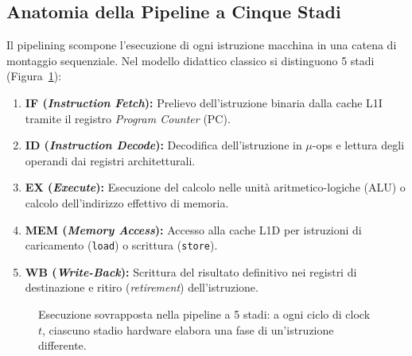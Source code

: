 \FloatBarrier
\subsection{Anatomia della Pipeline a Cinque Stadi}
\label{subsec:pipeline-5-stadi}

Il pipelining scompone l'esecuzione di ogni istruzione macchina in una catena di montaggio sequenziale. Nel modello didattico classico si distinguono 5 stadi (Figura~\ref{fig:pipeline-5-stadi}):
\begin{enumerate}
    \item \textbf{IF (\textit{Instruction Fetch}):} Prelievo dell'istruzione binaria dalla cache L1I tramite il registro \textit{Program Counter} (PC).
    \item \textbf{ID (\textit{Instruction Decode}):} Decodifica dell'istruzione in $\mu$-ops e lettura degli operandi dai registri architetturali.
    \item \textbf{EX (\textit{Execute}):} Esecuzione del calcolo nelle unit\`a aritmetico-logiche (ALU) o calcolo dell'indirizzo effettivo di memoria.
    \item \textbf{MEM (\textit{Memory Access}):} Accesso alla cache L1D per istruzioni di caricamento (\texttt{load}) o scrittura (\texttt{store}).
    \item \textbf{WB (\textit{Write-Back}):} Scrittura del risultato definitivo nei registri di destinazione e ritiro (\textit{retirement}) dell'istruzione.
\end{enumerate}

\begin{figure}[H]
\centering
{}
\caption{Esecuzione sovrapposta nella pipeline a 5 stadi: a ogni ciclo di clock $t$, ciascuno stadio hardware elabora una fase di un'istruzione differente.}
\label{fig:pipeline-5-stadi}
\end{figure}

